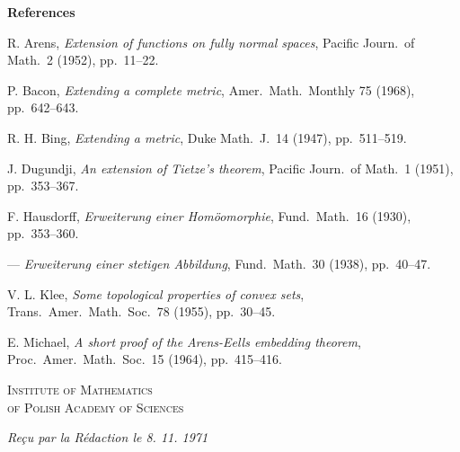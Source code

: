 \documentclass[11pt,a4paper,twoside]{article}
\begin{document}
\bigskip\begin{center}\textbf{References}\end{center}
\begin{enumerate}[label={[\arabic*]},leftmargin=2em,itemsep=3pt]
\item R. Arens, \textit{Extension of functions on fully normal spaces}, Pacific Journ.\ of Math.\ 2 (1952), pp.\ 11--22.
\item P. Bacon, \textit{Extending a complete metric}, Amer.\ Math.\ Monthly 75 (1968), pp.\ 642--643.
\item R. H. Bing, \textit{Extending a metric}, Duke Math.\ J.\ 14 (1947), pp.\ 511--519.
\item J. Dugundji, \textit{An extension of Tietze's theorem}, Pacific Journ.\ of Math.\ 1 (1951), pp.\ 353--367.
\end{enumerate}
\newpage
\begin{enumerate}[label={[\arabic*]},leftmargin=2em,itemsep=3pt,start=5]
\item F. Hausdorff, \textit{Erweiterung einer Homöomorphie}, Fund.\ Math.\ 16 (1930), pp.\ 353--360.
\item --- \textit{Erweiterung einer stetigen Abbildung}, Fund.\ Math.\ 30 (1938), pp.\ 40--47.
\item V. L. Klee, \textit{Some topological properties of convex sets}, Trans.\ Amer.\ Math.\ Soc.\ 78 (1955), pp.\ 30--45.
\item E. Michael, \textit{A short proof of the Arens-Eells embedding theorem}, Proc.\ Amer.\ Math.\ Soc.\ 15 (1964), pp.\ 415--416.
\end{enumerate}
\bigskip
\noindent\textsc{Institute of Mathematics\\of Polish Academy of Sciences}
\bigskip
\begin{center}\textit{Reçu par la Rédaction le 8. 11. 1971}\end{center}
\end{document}
